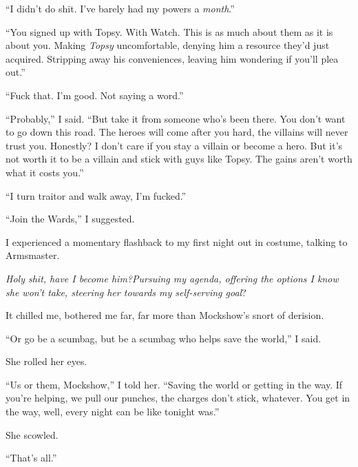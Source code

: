 ``I didn't do shit.  I've barely had my powers a \emph{month}.''



``You signed up with Topsy.  With Watch.  This is as much about them as it is about you. Making \emph{Topsy} uncomfortable, denying him a resource they'd just acquired.  Stripping away his conveniences, leaving him wondering if you'll plea out.''



``Fuck that.  I'm good.  Not saying a word.''



``Probably,'' I said.  ``But take it from someone who's been there.  You don't want to go down this road.  The heroes will come after you hard, the villains will never trust you.  Honestly?  I don't care if you stay a villain or become a hero.  But it's not worth it to be a villain and stick with guys like Topsy.  The gains aren't worth what it costs you.''



``I turn traitor and walk away, I'm fucked.''



``Join the Wards,'' I suggested.



I experienced a momentary flashback to my first night out in costume, talking to Armsmaster.



\emph{Holy shit, have I become him?}\emph{Pursuing my agenda, offering the options I know she won't take, steering her towards my self-serving goal}?



It chilled me, bothered me far, far more than Mockshow's snort of derision.



``Or go be a scumbag, but be a scumbag who helps save the world,'' I said.



She rolled her eyes.



``Us or them, Mockshow,'' I told her.  ``Saving the world or getting in the way.  If you're helping, we pull our punches, the charges don't stick, whatever.  You get in the way, well, every night can be like tonight was.''



She scowled.



``That's all.''



